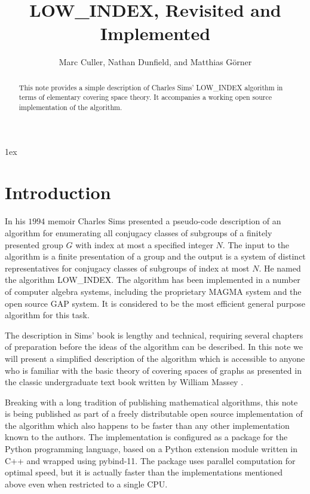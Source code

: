 \documentclass[12pt]{article}
\begin{document}
\normalfont
\title{LOW\_INDEX, Revisited and Implemented}
\author{Marc Culler, Nathan Dunfield, and Matthias G\"orner}
\maketitle
\begin{abstract}\noindent
This note provides a simple description of Charles Sims' LOW\_INDEX algorithm in terms of elementary covering space theory.  It accompanies a working open source implementation of the algorithm.
\end{abstract}
\parindent 0pt 
\parskip 1ex 
\section{Introduction}

In his $1994$ memoir \cite[Chapter 5]{Sims} Charles Sims presented a pseudo-code description of an algorithm for enumerating all conjugacy classes of subgroups of a finitely presented group $G$ with index at most a specified integer $N$.  The input to the algorithm is a finite presentation of a group and the output is a system of distinct representatives for conjugacy classes of subgroups of index at most $N$.  He named the algorithm LOW\_INDEX.  The algorithm has been implemented in a number of computer algebra systems, including the proprietary MAGMA system and the open source GAP system.  It is considered to be the most efficient general purpose algorithm for this task.

The description in Sims' book is lengthy and technical, requiring several chapters of preparation before the ideas of the algorithm can be described.  In this note we will present a simplified description of the algorithm which is accessible to anyone who is familiar with the basic theory of covering spaces of graphs as presented in the classic undergraduate text book written by William Massey \cite{Massey}.

Breaking with a long tradition of publishing mathematical algorithms, this note is being published as part of a freely distributable open source implementation of the algorithm which also happens to be faster than any other implementation known to the authors.  The implementation is configured as a package for the Python programming language, based on a Python extension module written in C++ and wrapped using pybind-11.  The package uses parallel computation for optimal speed, but it is actually faster than the implementations mentioned above even when restricted to a single CPU.
\end{document}
